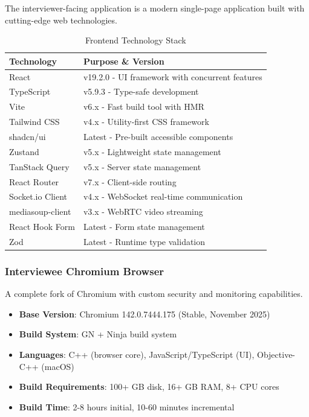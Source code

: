 \documentclass[11pt,letterpaper]{article}
\begin{document}
The interviewer-facing application is a modern single-page application built with cutting-edge web technologies.

\begin{table}[H]
\centering
\begin{tabularx}{\textwidth}{lX}
\toprule
\textbf{Technology} & \textbf{Purpose \& Version} \\
\midrule
React & v19.2.0 - UI framework with concurrent features \\
TypeScript & v5.9.3 - Type-safe development \\
Vite & v6.x - Fast build tool with HMR \\
Tailwind CSS & v4.x - Utility-first CSS framework \\
shadcn/ui & Latest - Pre-built accessible components \\
Zustand & v5.x - Lightweight state management \\
TanStack Query & v5.x - Server state management \\
React Router & v7.x - Client-side routing \\
Socket.io Client & v4.x - WebSocket real-time communication \\
mediasoup-client & v3.x - WebRTC video streaming \\
React Hook Form & Latest - Form state management \\
Zod & Latest - Runtime type validation \\
\bottomrule
\end{tabularx}
\caption{Frontend Technology Stack}
\end{table}

\subsubsection{Interviewee Chromium Browser}

A complete fork of Chromium with custom security and monitoring capabilities.

\begin{itemize}[noitemsep]
    \item \textbf{Base Version}: Chromium 142.0.7444.175 (Stable, November 2025)
    \item \textbf{Build System}: GN + Ninja build system
    \item \textbf{Languages}: C++ (browser core), JavaScript/TypeScript (UI), Objective-C++ (macOS)
    \item \textbf{Build Requirements}: 100+ GB disk, 16+ GB RAM, 8+ CPU cores
    \item \textbf{Build Time}: 2-8 hours initial, 10-60 minutes incremental
\end{itemize}
\end{document}
